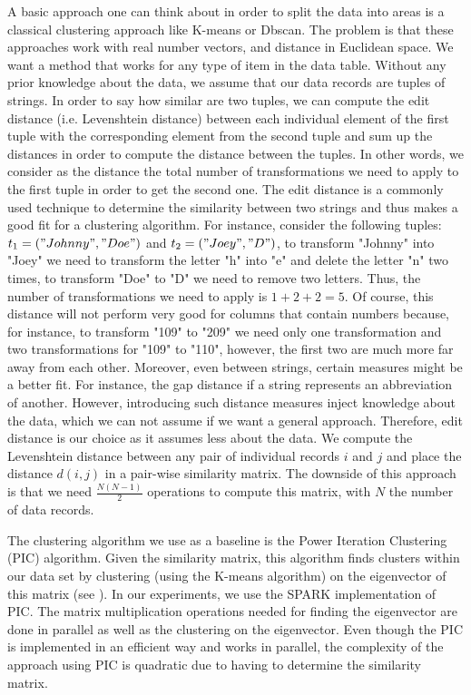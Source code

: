 A basic approach one can think about in order to split the data into areas is a classical clustering approach like K-means or Dbscan. The problem is that these approaches work with real number vectors, and distance in Euclidean space. We want a method that works for any type of item in the data table. Without any prior knowledge about the data, we assume that our data records are tuples of strings. In order to say how similar are two tuples, we can compute the edit distance (i.e. Levenshtein distance) between each individual element of the first tuple with the corresponding element from the second tuple and sum up the distances in order to compute the distance between the tuples. In other words, we consider as the distance the total number of transformations we need to apply to the first tuple in order to get the second one. The edit distance is a commonly used technique to determine the similarity between two strings and thus makes a good fit for a clustering algorithm. For instance, consider the following tuples: $t_1 = ("Johnny", "Doe")$ and $t_2 = ("Joey", "D")$, to transform "Johnny" into "Joey" we need to transform the letter "h" into "e" and delete the letter "n" two times, to transform "Doe" to "D" we need to remove two letters. Thus, the number of transformations we need to apply is $1 + 2 + 2 = 5$. Of course, this distance will not perform very good for columns that contain numbers because, for instance, to transform "109" to "209" we need only one transformation and two transformations for "109" to "110", however, the first two are much more far away from each other. Moreover, even between strings, certain measures might be a better fit. For instance, the gap distance if a string represents an abbreviation of another. However, introducing such distance measures inject knowledge about the data, which we can not assume if we want a general approach. Therefore, edit distance is our choice as it assumes less about the data. We compute the Levenshtein distance between any pair of individual records $i$ and $j$ and place the distance $d(i,j)$ in a pair-wise similarity matrix. The downside of this approach is that we need $\frac{N (N - 1)}{2}$ operations to compute this matrix, with $N$ the number of data records. 

The clustering algorithm we use as a baseline is the Power Iteration Clustering (PIC) algorithm. Given the similarity matrix, this algorithm finds clusters within our data set by clustering (using the K-means algorithm) on the eigenvector of this matrix (see \cite{PIC}). In our experiments, we use the SPARK implementation of PIC. The matrix multiplication operations needed for finding the eigenvector are done in parallel as well as the clustering on the eigenvector. Even though the PIC is implemented in an efficient way and works in parallel, the complexity of the approach using PIC is quadratic due to having to determine the similarity matrix.
